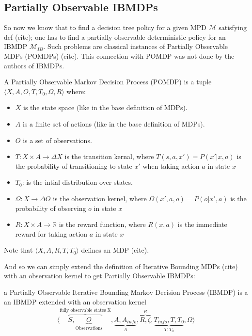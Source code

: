 \subsection{Partially Observable IBMDPs}

So now we know that to find a decision tree policy for a given MPD $\mathcal{M}$ satisfying def (cite); one has to find a partially observable deterministic policy for an IBMDP $\mathcal{M}_{IB}$.
Such problems are classical instances of Partially Observable MDPs (POMDPs) (cite). This connection with POMDP was not done by the authors of IBMDPs. 

\begin{definition}
A Partially Observable Markov Decision Process (POMDP) is a tuple $\langle X, A, O, T, T_0, \Omega, R\rangle$ where:
\begin{itemize}
    \item $X$ is the state space (like in the base definition of MDPs).
    \item $A$ is a finite set of actions (like in the base definition of MDPs).
    \item $O$ is a set of observations.
    \item $T: X \times A \rightarrow \Delta X$ is the transition kernal, where $T(s, a, x') = P(x'|x, a)$ is the probability of transitioning to state $x'$ when taking action $a$ in state $x$
    \item $T_0$: is the intial distribution over states. 
    \item $\Omega: X \rightarrow \Delta O$ is the observation kernel, where $\Omega(x', a, o) = P(o|x', a)$ is the probability of observing $o$ in state $x$
    \item $R: X \times A \rightarrow \mathbb{R}$ is the reward function, where $R(x, a)$ is the immediate reward for taking action $a$ in state $x$
\end{itemize}
Note that $\langle X, A, R, T, T_0 \rangle$ defines an MDP (cite).
\end{definition}

And so we can simply extend the definition of Iterative Bounding MDPs (cite) with an observation kernel to get Partially Observable IBMDPs:
\begin{definition} a Partially Observable Iterative Bounding Markov Decision Process (IBMDP) is a an IBMDP extended with an observation kernel 
    \begin{align*}
        \langle \overbrace{S, \underbrace{O}_{\text{Observations}}}^{\text{fully observable states X}}, \underbrace{A, A_{info}}_{A}, \overbrace{R, \zeta}^{R}, \underbrace{T_{info}, T, T_0}_{T, T_0}, \Omega \rangle
    \end{align*}
\end{definition}

